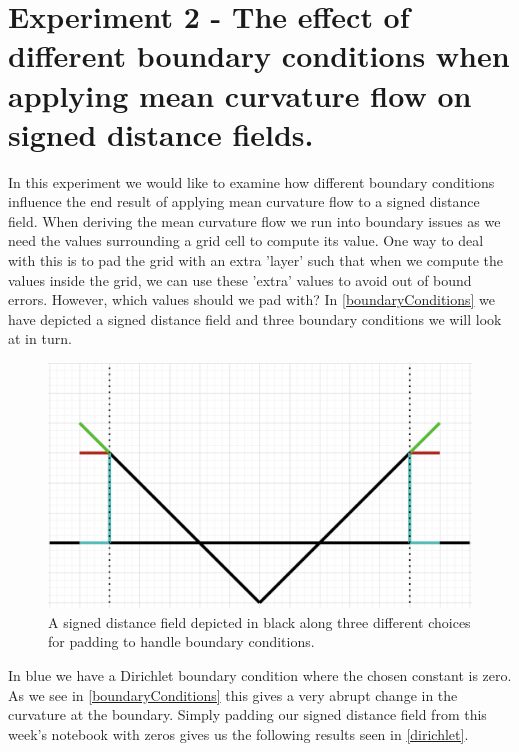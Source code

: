 \section{Experiment 2 - The effect of different boundary conditions when applying mean curvature flow on signed distance fields.}
In this experiment we would like to examine how different boundary conditions influence the end result of applying mean curvature flow to a signed distance field. When deriving the mean curvature flow we run into boundary issues as we need the values surrounding a grid cell to compute its value. One way to deal with this is to pad the grid with an extra 'layer' such that when we compute the values inside the grid, we can use these 'extra' values to avoid out of bound errors. However, which values should we pad with? In \autoref{boundaryConditions} we have depicted a signed distance field and three boundary conditions we will look at in turn.
\begin{figure}[H]
	\centering
	\includegraphics[width=0.51\linewidth]{Materials/MeanFlow/Boundaries}
	\caption{A signed distance field depicted in black along three different choices for padding to handle boundary conditions.}
	\label{boundaryConditions}
\end{figure}
In blue we have a Dirichlet boundary condition where the chosen constant is zero. As we see in \autoref{boundaryConditions} this gives a very abrupt change in the curvature at the boundary. Simply padding our signed distance field from this week's notebook with zeros gives us the following results seen in \autoref{dirichlet}.
